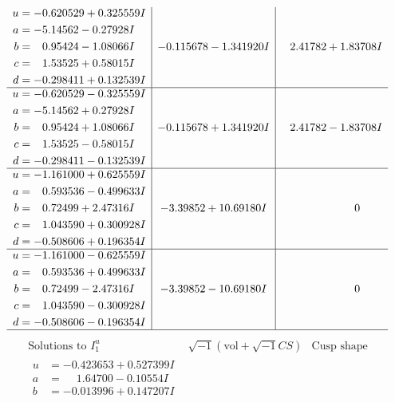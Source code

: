 \documentclass[1p]{elsarticle_modified}
\theoremstyle{definition}
\newcommand{\I}{\sqrt{-1}}
\begin{document}
$$\begin{array}{c|c|c}
\begin{aligned}
u &= -0.620529 + 0.325559 I \\
a &= -5.14562 - 0.27928 I \\
b &= \phantom{-}0.95424 - 1.08066 I \\
c &= \phantom{-}1.53525 + 0.58015 I \\
d &= -0.298411 + 0.132539 I\end{aligned}
 & -0.115678 - 1.341920 I & \phantom{-}2.41782 + 1.83708 I \\ \hline\begin{aligned}
u &= -0.620529 - 0.325559 I \\
a &= -5.14562 + 0.27928 I \\
b &= \phantom{-}0.95424 + 1.08066 I \\
c &= \phantom{-}1.53525 - 0.58015 I \\
d &= -0.298411 - 0.132539 I\end{aligned}
 & -0.115678 + 1.341920 I & \phantom{-}2.41782 - 1.83708 I \\ \hline\begin{aligned}
u &= -1.161000 + 0.625559 I \\
a &= \phantom{-}0.593536 - 0.499633 I \\
b &= \phantom{-}0.72499 + 2.47316 I \\
c &= \phantom{-}1.043590 + 0.300928 I \\
d &= -0.508606 + 0.196354 I\end{aligned}
 & -3.39852 + 10.69180 I & \phantom{-0.000000 } 0 \\ \hline\begin{aligned}
u &= -1.161000 - 0.625559 I \\
a &= \phantom{-}0.593536 + 0.499633 I \\
b &= \phantom{-}0.72499 - 2.47316 I \\
c &= \phantom{-}1.043590 - 0.300928 I \\
d &= -0.508606 - 0.196354 I\end{aligned}
 & -3.39852 - 10.69180 I & \phantom{-0.000000 } 0\\
 \hline 
 \end{array}$$\newpage$$\begin{array}{c|c|c}  
\text{Solutions to }I^u_{1}& \I (\text{vol} + \sqrt{-1}CS) & \text{Cusp shape}\\
 \hline 
\begin{aligned}
u &= -0.423653 + 0.527399 I \\
a &= \phantom{-}1.64700 - 0.10554 I \\
b &= -0.013996 + 0.147207 I \\

\end{aligned}
\end{array}$$
\end{document}
